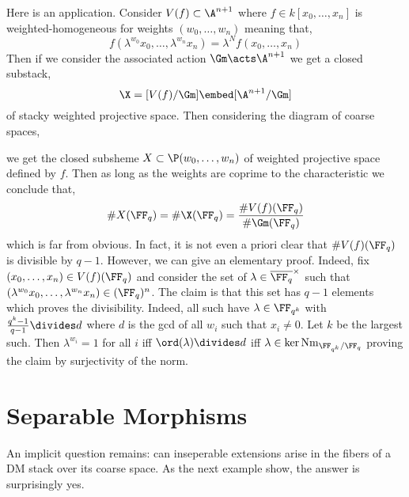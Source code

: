 \documentclass[12pt]{article}
\begin{document}
\begin{example}
Here is an application. Consider $V(f) \subset \A^{n+1}$ where $f \in k[x_0, \dots, x_n]$ is weighted-homogeneous for weights $(w_0, \dots, w_n)$ meaning that,
\[ f(\lambda^{w_0} x_0, \dots, \lambda^{w_n} x_n) = \lambda^N f(x_0, \dots, x_n) \]
Then if we consider the associated action $\Gm \acts \A^{n+1}$ we get a closed substack,
\[ \X = [V(f) / \Gm] \embed [\A^{n+1} / \Gm] \]
of stacky weighted projective space. Then considering the diagram of coarse spaces,
\begin{center}
\end{center}
we get the closed subsheme $X \subset \P(w_0, \dots, w_n)$ of weighted projective space defined by $f$. Then as long as the weights are coprime to the characteristic we conclude that,
\[ \# X(\FF_q) = \# \X(\FF_q) = \frac{\# V(f)(\FF_q)}{\# \Gm(\FF_q)} \]
which is far from obvious. In fact, it is not even a priori clear that $\# V(f)(\FF_q)$ is divisible by $q-1$. However, we can give an elementary proof. Indeed, fix $(x_0, \dots, x_n) \in V(f)(\FF_q)$ and consider the set of $\lambda \in \overline{\FF_q}^\times$ such that $(\lambda^{w_0} x_0, \dots, \lambda^{w_n} x_n) \in (\FF_q)^n$. The claim is that this set has $q-1$ elements which proves the divisibility. Indeed, all such have $\lambda \in \FF_{q^k}$ with $\frac{q^k-1}{q-1} \divides d$ where $d$ is the gcd of all $w_i$ such that $x_i \neq 0$. Let $k$ be the largest such. Then $\lambda^{w_i} = 1$ for all $i$ iff $\ord(\lambda) \divides d$ iff $\lambda \in \ker{\mathrm{Nm}_{\FF_{q^k}/\FF_q}}$ proving the claim by surjectivity of the norm.
\end{example}

\section{Separable Morphisms}

An implicit question remains: can inseperable extensions arise in the fibers of a DM stack over its coarse space. As the next example show, the answer is surprisingly yes.
\end{document}
